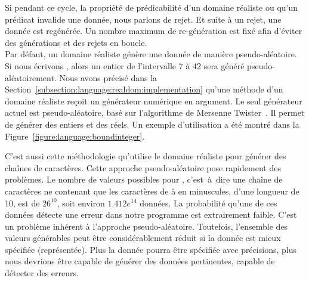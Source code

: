 Si pendant ce cycle, la propriété de prédicabilité d'un domaine réaliste ou
qu'un prédicat invalide une donnée, nous parlons de {\strong rejet}. Et suite à
un rejet, une donnée est regénérée. Un nombre maximum de re-génération est fixé
afin d'éviter des générations et des rejets en boucle. \\

Par défaut, un domaine réaliste génère une donnée de manière pseudo-aléatoire.
Si nous écrivons , alors un entier de l'intervalle 7 à
42 sera généré pseudo-aléatoirement. Nous avons précisé dans la
Section~\ref{subsection:language:realdom:implementation} qu'une méthode
 d'un domaine réaliste reçoit un générateur numérique en argument.
Le seul générateur actuel est pseudo-aléatoire, basé sur l'algorithme de
Mersenne Twister~. Il permet de générer des entiers et des
réels. Un exemple d'utilisation a été montré dans la
Figure~\ref{figure:language:boundinteger}.

C'est aussi cette méthodologie qu'utilise le domaine réaliste  pour
générer des chaînes de caractères. Cette approche pseudo-aléatoire pose
rapidement des problèmes. Le nombre de valeurs possibles pour , c'est~à~dire une chaîne de caractères ne contenant que les caractères
de  à  en minuscules, d'une longueur de 10, est de $26^{10}$,
soit environ $1.412e^{14}$ données. La probabilité qu'une de ces données détecte
une erreur dans notre programme est extrairement faible. C'est un problème
inhérent à l'approche pseudo-aléatoire. Toutefois, l'ensemble des valeurs
générables peut être considérablement réduit si la donnée est mieux spécifiée
(représentée). Plus la donnée pourra être spécifiée avec précisions, plus nous
devrions être capable de générer des données pertinentes, capable de détecter
des erreurs.
